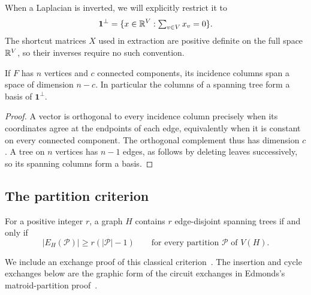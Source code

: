 When a Laplacian is inverted, we will explicitly restrict it to
\[
 \mathbf1^\perp=\{x\in\mathbb R^V:\textstyle\sum_{v\in V}x_v=0\}.
\]
The shortcut matrices \(X\) used in extraction are positive definite
on the full space \(\mathbb R^V\), so their inverses require no such convention.

\begin{lemma}\label{lem:incidence-rank}
If \(F\) has \(n\) vertices and \(c\) connected components, its
incidence columns span a space of dimension \(n-c\).
In particular the columns of a spanning tree form a basis of
\(\mathbf1^\perp\).
\end{lemma}
\begin{proof}
A vector is orthogonal to every incidence column precisely when
its coordinates agree at the endpoints of each edge, equivalently
when it is constant on every connected component.
The orthogonal complement thus has dimension \(c\).
A tree on \(n\) vertices has \(n-1\) edges, as follows by deleting
leaves successively, so its spanning columns form a basis.
\end{proof}

\subsection{The partition criterion}

\begin{theorem}\label{thm:packing}
For a positive integer \(r\), a graph \(H\) contains \(r\)
edge-disjoint spanning trees if and only if
\[
 |E_H(\mathcal P)|\ge r(|\mathcal P|-1)
 \qquad\text{for every partition }\mathcal P\text{ of }V(H).
\]
\end{theorem}

We include an exchange proof of this classical
criterion~\cite{NashWilliams,Tutte}.
The insertion and cycle exchanges below are the graphic form of
the circuit exchanges in Edmonds's matroid-partition
proof~\cite[Section~1.6]{Edmonds1965}.

